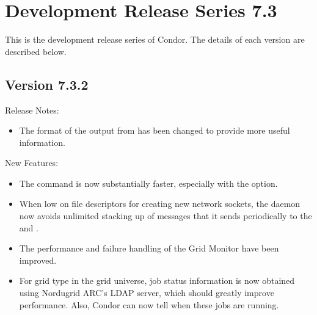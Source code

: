 
\section{\label{sec:History-7-3}Development Release Series 7.3}

This is the development release series of Condor.
The details of each version are described below.

\subsection*{\label{sec:New-7-3-2}Version 7.3.2}

\noindent Release Notes:

\begin{itemize}

\item The format of the output from   has been 
changed to provide more useful information.

\end{itemize}

\noindent New Features:

\begin{itemize}

\item The  command is now substantially faster, 
especially with the  option.

\item When low on file descriptors for creating new network sockets,
the  daemon now avoids unlimited stacking up of
messages that it sends periodically to the  
and .

\item The performance and failure handling of the Grid Monitor have been
improved.

\item For grid type  in the grid universe,
job status information
is now obtained using Nordugrid ARC's LDAP server, which should greatly
improve performance. Also, Condor can now tell when these jobs are running.

\end{itemize}

